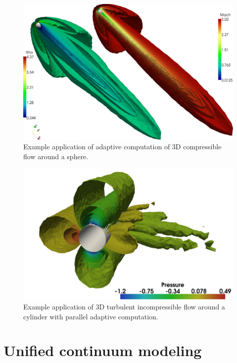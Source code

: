 \begin{figure}
  \center
  \includegraphics[width=\largefig]{chapters/hoffman-2/pdf/compressible3D.pdf}
  \caption{Example application of adaptive computation of 3D compressible
    flow around a sphere.}
  \label{fig:compr3D}
\end{figure}

\begin{figure}
  \center
  \includegraphics[width=\largefig]{chapters/hoffman-2/pdf/Hoffman_fig3d.pdf}
  \caption{Example application of 3D turbulent incompressible flow around
    a cylinder with parallel adaptive computation.}
  \label{fig:parcyl3D}
\end{figure}

\label{chapter:implementation:unicorn}

\section{Unified continuum modeling}

